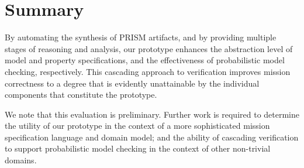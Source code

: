 \section{Summary}
\label{sec:Evaluation_Summary}

By automating the synthesis of PRISM artifacts, and by providing multiple stages of reasoning and analysis, our prototype enhances the abstraction level of model and property specifications, and the effectiveness of probabilistic model checking, respectively. This cascading approach to verification improves mission correctness to a degree that is evidently unattainable by the individual components that constitute the prototype.

We note that this evaluation is preliminary. Further work is required to determine the utility of our prototype in the context of a more sophisticated mission specification language and domain model; and the ability of cascading verification to support probabilistic model checking in the context of other non-trivial domains.
